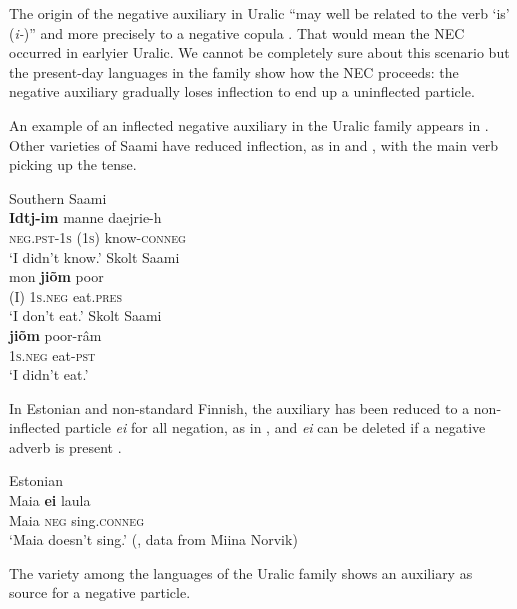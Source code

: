 ﻿\documentclass[output=paper]{langsci/langscibook}
\begin{document}
The origin of the negative auxiliary in Uralic ``may well be related to the
verb `is' (\textit{i-})'' \citep[594]{Simoncsics1998} and more precisely to
a negative copula \citep[173]{Honti1997-other}. That would mean the NEC occurred
in earlyier Uralic. We cannot be completely sure about this scenario but
the present-day languages in the family show how the NEC proceeds: the
negative auxiliary gradually loses inflection to end up a uninflected
particle.

An example of an inflected negative auxiliary in the Uralic family appears
in . Other varieties of Saami have reduced
inflection, as in  and
, with the main verb picking up the tense.
%
\begin{exe}\ex\begin{xlist}
    \ex Southern Saami \label{ex:other-saami-know}\\
    \gll \textbf{Idtj-im} {\op}manne{\cp} daejrie-h \\
    \textsc{neg.pst-1s}   (\textsc{1s})    know-\textsc{conneg} \\
    \glt `I didn't know.' \citep[44]{Bergsland1994}
    \ex Skolt Saami \label{ex:other-saami-eat-prs}\\
    \gll {\op}mon{\cp}  \textbf{jiõm}    poor        \\
    (I)  \textsc{1s.neg}    eat.\textsc{pres} \\
    \glt `I don't eat.' \parencite[355--6]{MiestamoKoponen2015}
    \ex Skolt Saami \label{ex:other-saami-eat-pst}\\
    \gll \textbf{jiõm}  poor-râm          \\
    \textsc{1s.neg}  eat-\textsc{pst} \\
    \glt`I didn't eat.' \parencite[355--6]{MiestamoKoponen2015}
    \end{xlist}\end{exe}
%
In Estonian and non-standard Finnish, the
auxiliary has been reduced to a non-inflected particle \textit{ei} for all
negation, as in , and \textit{ei} can be deleted if a
negative adverb is present \parencite[see][164]{Honti1997-other}.
%
\begin{exe}\ex Estonian \label{ex:other-estonian}\\
    \gll Maia \textbf{ei}   laula      \\
    Maia \textsc{neg}   sing.\textsc{conneg} \\
    \glt `Maia doesn't sing.' (\citealt[151]{Veselinova2016}, data
    from Miina Norvik)
    \end{exe}
%
The variety among the languages of the Uralic family shows an auxiliary as
source for a negative particle.
\end{document}
